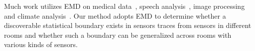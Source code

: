 Much work utilizes EMD on medical data~\cite{ecg}, speech analysis~\cite{speech}, image processing~\cite{ip} 
and climate analysis~\cite{climate}. Our method adopts EMD to determine whether a discoverable statistical boundary exists in sensors traces
from sensors in different rooms and whether such a boundary
 can be generalized across rooms with various kinds of sensors.
